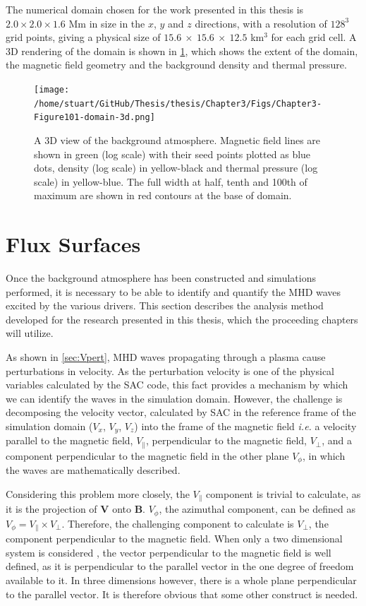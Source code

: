\documentclass[a4paper,12pt,fourier,authoryear,custommargin]{Classes/PhDThesisPSnPDF}
\renewcommand{\vec}{\mathbf}
\begin{document}
The numerical domain chosen for the work presented in this thesis is $2.0 \times 2.0 \times 1.6$ Mm in size in the $x$, $y$ and $z$ directions, with a resolution of $128^3$ grid points, giving a physical size of $15.6\ \times\ 15.6\ \times\ 12.5$ km$^3$ for each grid cell.
A 3D rendering of the domain is shown in \cref{fig:domain-3d}, which shows the extent of the domain, the magnetic field geometry and the background density and thermal pressure.





\begin{figure}[h]
    \centering
    \texttt{[image: /home/stuart/GitHub/Thesis/thesis/Chapter3/Figs/Chapter3-Figure101-domain-3d.png]}
    \caption{A 3D view of the background atmosphere. Magnetic field lines are shown in green (log scale) with their seed points plotted as blue dots, density (log scale) in yellow-black and thermal pressure (log scale) in yellow-blue. The full width at half, tenth and 100th of maximum are shown in red contours at the base of domain.}
    \label{fig:domain-3d}
\end{figure}

\section{Flux Surfaces}\label{sec:fluxsurfaces}

Once the background atmosphere has been constructed and simulations performed, it is necessary to be able to identify and quantify the MHD waves excited by the various drivers.
This section describes the analysis method developed for the research presented in this thesis, which the proceeding chapters will utilize.

As shown in \cref{sec:Vpert}, MHD waves propagating through a plasma cause perturbations in velocity.
As the perturbation velocity is one of the physical variables calculated by the SAC code, this fact provides a mechanism by which we can identify the waves in the simulation domain.
However, the challenge is decomposing the velocity vector, calculated by SAC in the reference frame of the simulation domain ($V_x$, $V_y$, $V_z$) into the frame of the magnetic field \textit{i.e.} a velocity parallel to the magnetic field, $V_\parallel$, perpendicular to the magnetic field, $V_\perp$, and a component perpendicular to the magnetic field in the other plane $V_\phi$, in which the waves are mathematically described.

Considering this problem more closely, the $V_\parallel$ component is trivial to calculate, as it is the projection of $\vec{V}$ onto $\vec{B}$.
$V_\phi$, the azimuthal component, can be defined as $V_\phi = V_\parallel \times V_\perp$.
Therefore, the challenging component to calculate is $V_\perp$, the component perpendicular to the magnetic field.
When only a two dimensional system is considered \citep[e.g.][]{bogdan2003,fedun2011,shelyag2012}, the vector perpendicular to the magnetic field is well defined, as it is perpendicular to the parallel vector in the one degree of freedom available to it.
In three dimensions however, there is a whole plane perpendicular to the parallel vector.
It is therefore obvious that some other construct is needed.
\end{document}
